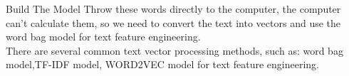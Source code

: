 \documentclass[
 size=14pt,
 paper=smartboard,  %
 mode=present, 		%
 display=slides, 	%
 style=tuliplab,  	%
 pauseslide,
 fleqn,leqno]{powerdot}
\begin{document}
\begin{slide}{Build The Model}
  Throw these words directly to the computer, the computer can't calculate them, 
  so we need to convert the text into vectors and use the word bag model for text feature engineering.
  \\There are several common text vector processing methods, such as: word bag model,TF-IDF model,
  WORD2VEC model for text feature engineering.


\end{slide}
\end{document}
